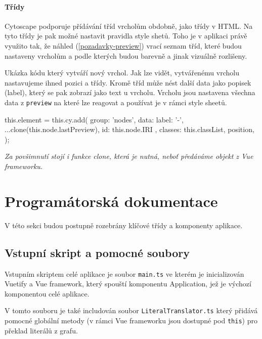\paragraph{Třídy} Cytoscape podporuje přídávání tříd vrcholům obdobně, jako třídy v HTML. Na tyto třídy je pak možné nastavit pravidla style shetů. Toho je v aplikaci právě využito tak, že náhled (\ref{pozadavky-preview}) vrací seznam tříd, které budou nastaveny vrcholům a podle kterých budou barevně a jinak vizuálně rozlišeny.


\begin{prikl}
Ukázka kódu který vytváří nový vrchol. Jak lze vidět, vytvářenému vrcholu nastavujeme ihned pozici a třídy. Kromě tříd může nést další data jako popisek (label), který se pak zobrazí jako text u vrcholu. Vrcholu jsou nastavena všechna data z \texttt{preview} na které lze reagovat a používat je v rámci style sheetů.
\begin{code}
this.element = this.cy.add({
    group: 'nodes',
    data: {
      label: '-',
      ...clone(this.node.lastPreview),
      id: this.node.IRI
    },
    classes: this.classList,
    position,
});
\end{code}
\textit{Za povšimnutí stojí i funkce clone, která je nutná, neboť předáváme objekt z Vue frameworku.}
\end{prikl}


\newpage







\section{Programátorská dokumentace}
V této sekci budou postupně rozebrány klíčové třídy a komponenty aplikace.

\subsection{Vstupní skript a pomocné soubory}
Vstupním skriptem celé aplikace je soubor \texttt{main.ts} ve kterém je inicializován Vuetify a Vue framework, který spouští komponentu Application, jež je výchozí komponentou celé aplikace.

V tomto souboru je také includován soubor \texttt{LiteralTranslator.ts} který přidává pomocné globální metody (v rámci Vue frameworku jsou dostupné pod \texttt{this}) pro překlad literálů z grafu.

